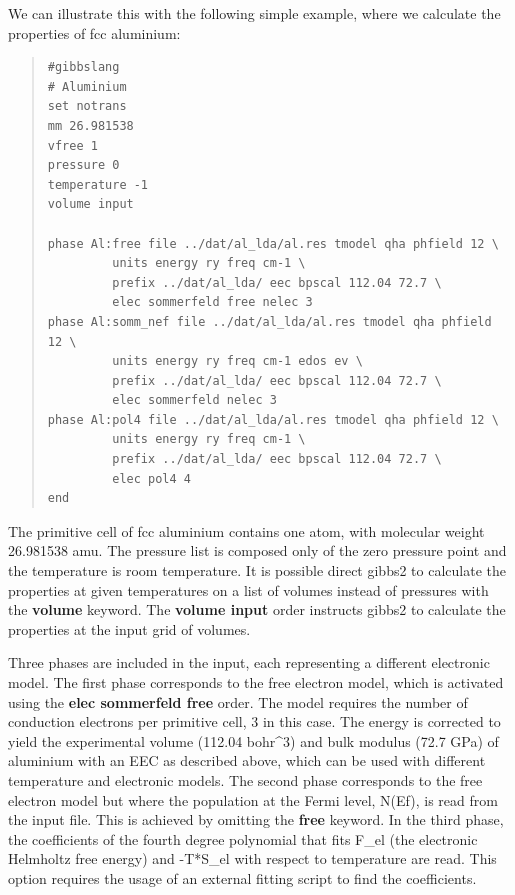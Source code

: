 \documentclass[a4paper]{article}
\begin{document}
We can illustrate this with the following simple example, where we
calculate the properties of fcc aluminium:
%
\begin{quote}
\begin{verbatim}
#gibbslang
# Aluminium
set notrans
mm 26.981538
vfree 1
pressure 0
temperature -1
volume input

phase Al:free file ../dat/al_lda/al.res tmodel qha phfield 12 \
         units energy ry freq cm-1 \
         prefix ../dat/al_lda/ eec bpscal 112.04 72.7 \
         elec sommerfeld free nelec 3
phase Al:somm_nef file ../dat/al_lda/al.res tmodel qha phfield 12 \
         units energy ry freq cm-1 edos ev \
         prefix ../dat/al_lda/ eec bpscal 112.04 72.7 \
         elec sommerfeld nelec 3
phase Al:pol4 file ../dat/al_lda/al.res tmodel qha phfield 12 \
         units energy ry freq cm-1 \
         prefix ../dat/al_lda/ eec bpscal 112.04 72.7 \
         elec pol4 4
end
\end{verbatim}
\end{quote}

The primitive cell of fcc aluminium contains one atom, with molecular
weight 26.981538 amu. The pressure list is composed only of the zero
pressure point and the temperature is room temperature. It is possible
direct gibbs2 to calculate the properties at given temperatures on a
list of volumes instead of pressures with the \textbf{volume} keyword. The
\textbf{volume input} order instructs gibbs2 to calculate the properties at
the input grid of volumes.

Three phases are included in the input, each representing a different
electronic model. The first phase corresponds to the free electron
model, which is activated using the \textbf{elec sommerfeld free}
order. The model requires the number of conduction electrons per
primitive cell, 3 in this case. The energy is corrected to yield the
experimental volume (112.04 bohr\textasciicircum{}3) and bulk modulus (72.7 GPa) of
aluminium with an EEC as described above, which can be used with
different temperature and electronic models. The second phase
corresponds to the free electron model but where the population at the
Fermi level, N(Ef), is read from the input file. This is achieved by
omitting the \textbf{free} keyword. In the third phase, the coefficients of
the fourth degree polynomial that fits F\_el (the electronic Helmholtz
free energy) and -T*S\_el with respect to temperature are read. This
option requires the usage of an external fitting script to find the
coefficients.
\end{document}
